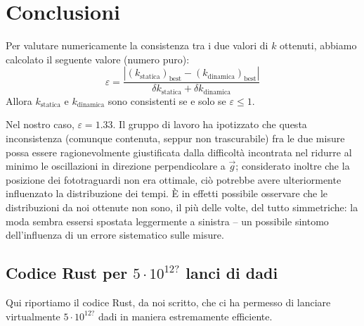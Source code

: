 \documentclass{article}
\begin{document}
\section{Conclusioni}
Per valutare numericamente la consistenza tra i due valori di $k$ ottenuti,
abbiamo calcolato il seguente valore (numero puro):
\[
    \varepsilon =
    \frac{
        \left|\left(k_\text{statica}\right)_\text{best} - \left(k_\text{dinamica}\right)_\text{best}\right|
    }{
        \delta k_\text{statica} + \delta k_\text{dinamica}
    }
\]
Allora $k_\text{statica}$ e $k_\text{dinamica}$ sono consistenti se e solo se $\varepsilon \le 1$.

Nel nostro caso, $\varepsilon = 1.33$. Il gruppo di lavoro ha ipotizzato che
questa inconsistenza (comunque contenuta, seppur non trascurabile) fra le due
misure possa essere ragionevolmente giustificata dalla difficoltà incontrata
nel ridurre al minimo le oscillazioni in direzione perpendicolare a $\vec{g}$;
considerato inoltre che la posizione dei fototraguardi non era ottimale, ciò
potrebbe avere ulteriormente influenzato la distribuzione dei tempi. È in
effetti possibile osservare che le distribuzioni da noi ottenute non sono,
il più delle volte, del tutto simmetriche: la moda sembra essersi spostata
leggermente a sinistra – un possibile sintomo dell'influenza di un
errore sistematico sulle misure.

\begin{appendices}
    \section{Codice Rust per $5\cdot10^{12?}$ lanci di dadi}
    Qui riportiamo il codice Rust, da noi scritto, che ci ha permesso di
    lanciare virtualmente $5\cdot10^{12?}$ dadi in maniera estremamente
    efficiente.
\end{appendices}
\end{document}
